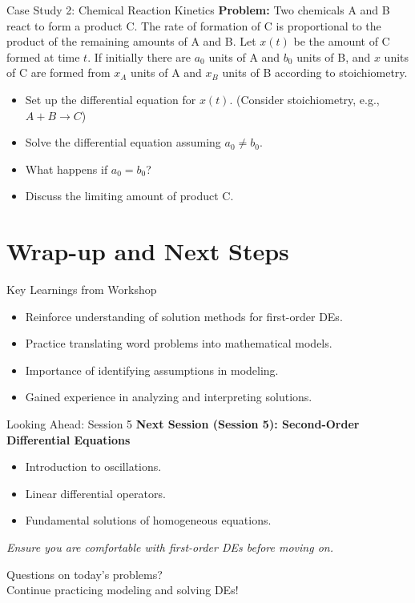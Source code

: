 \documentclass[10pt,aspectratio=169]{beamer}
\newcommand{\concept}[1]{\textbf{#1}}
\newcommand{\emphasis}[1]{\textit{#1}}
\begin{document}
\begin{frame}{Case Study 2: Chemical Reaction Kinetics}
    \concept{Problem:} Two chemicals A and B react to form a product C. The rate of formation of C is proportional to the product of the remaining amounts of A and B. Let $x(t)$ be the amount of C formed at time $t$. If initially there are $a_0$ units of A and $b_0$ units of B, and $x$ units of C are formed from $x_A$ units of A and $x_B$ units of B according to stoichiometry.
    \begin{itemize}
        \item Set up the differential equation for $x(t)$. (Consider stoichiometry, e.g., $A+B \to C$)
        \item Solve the differential equation assuming $a_0 \neq b_0$.
        \item What happens if $a_0 = b_0$?
        \item Discuss the limiting amount of product C.
    \end{itemize}
\end{frame}

\section{Wrap-up and Next Steps}
\begin{frame}{Key Learnings from Workshop}
    \begin{itemize}
        \item Reinforce understanding of solution methods for first-order DEs.
        \item Practice translating word problems into mathematical models.
        \item Importance of identifying assumptions in modeling.
        \item Gained experience in analyzing and interpreting solutions.
    \end{itemize}
\end{frame}

\begin{frame}{Looking Ahead: Session 5}
    \textbf{Next Session (Session 5): Second-Order Differential Equations}
    \begin{itemize}
        \item Introduction to oscillations.
        \item Linear differential operators.
        \item Fundamental solutions of homogeneous equations.
    \end{itemize}
    \emphasis{Ensure you are comfortable with first-order DEs before moving on.}
\end{frame}

\begin{frame}[standout]
    Questions on today's problems? \\
    Continue practicing modeling and solving DEs!
\end{frame}
\end{document}
